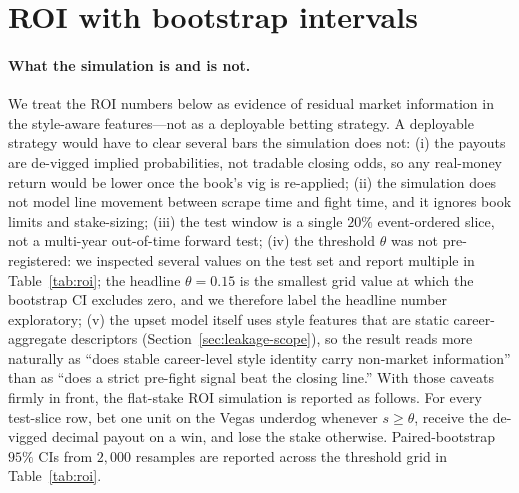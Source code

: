 \documentclass[12pt,oneside]{report}
\begin{document}
\section{ROI with bootstrap intervals}

\paragraph{What the simulation is and is not.}  We treat the
ROI numbers below as evidence of residual market information
in the style-aware features---not as a deployable betting
strategy.  A deployable strategy would have to clear several bars
the simulation does not: (i) the payouts are de-vigged implied
probabilities, not tradable closing odds, so any real-money return
would be lower once the book's vig is re-applied; (ii) the
simulation does not model line movement between scrape time and
fight time, and it ignores book limits and stake-sizing; (iii) the
test window is a single $20\%$ event-ordered slice, not a
multi-year out-of-time forward test; (iv) the threshold \(\theta\)
was not pre-registered: we inspected several values on the
test set and report multiple in Table~\ref{tab:roi}; the headline
\(\theta = 0.15\) is the smallest grid value at which the bootstrap
CI excludes zero, and we therefore label the headline number
exploratory; (v) the upset model itself uses style features that
are static career-aggregate descriptors
(Section~\ref{sec:leakage-scope}), so the result reads more
naturally as ``does stable career-level style identity carry
non-market information'' than as ``does a strict pre-fight signal
beat the closing line.''  With those caveats firmly in front, the
flat-stake ROI simulation is reported as follows.  For every
test-slice row, bet one unit on the Vegas underdog whenever
\(s \ge \theta\), receive the de-vigged decimal payout on a win, and
lose the stake otherwise.  Paired-bootstrap $95\%$ CIs from
$2{,}000$ resamples are reported across the threshold grid in
Table~\ref{tab:roi}.
\end{document}
